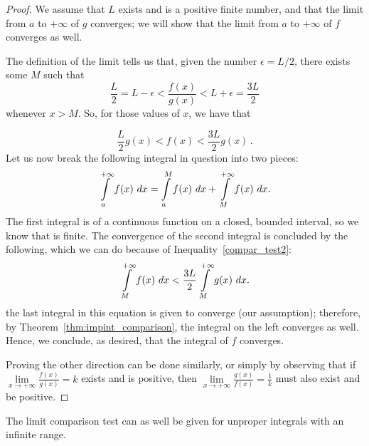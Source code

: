 \begin{proof}
We assume that $L$ exists and is a positive finite number, and that the limit from $a$ to $+\infty$ of $g$ converges; we will show that the limit from $a$ to $+\infty$ of $f$ converges as well. 

The definition of the limit tells us that, given the number $\epsilon=L/2$, there exists some $M$ such that
$$
\frac{L}{2}=L-\epsilon< \frac{f(x)}{g(x)}<L+\epsilon=\frac{3L}{2}
$$
whenever $x>M$. So, for those values of $x$, we have that 

\begin{equation}
\frac{L}{2}g(x)<f(x)<\frac{3L}{2}g(x)\,.
\label{compar_test2}
\end{equation}
Let us now break the following integral in question into two pieces:
$$
\ds \int\limits_a^{+\infty} f(x)\ dx=\ds \int\limits_a^{M} f(x)\ dx+\ds \int\limits_{M}^{+\infty} f(x)\ dx.
$$
The first integral is of a continuous function on a closed, bounded interval, so we know that is finite. The convergence of the second integral is concluded by the following, which we can do because of Inequality~\eqref{compar_test2}:
$$
\ds \int\limits_{M}^{+\infty} f(x)\ dx<\frac{3L}{2}\ds \int\limits_{M}^{+\infty} g(x)\ dx.
$$
the last integral in this equation is given to converge (our assumption); therefore, by Theorem~\ref{thm:impint_comparison}, the integral on the left converges as well. Hence, we conclude, as desired, that the integral of $f$ converges. 

Proving the other direction can be done similarly, or simply by observing that if $\lim\limits_{x \to +\infty}\frac{f(x)}{g(x)}=k$ exists and is positive, then
$\lim\limits_{x \to +\infty}\frac{g(x)}{f(x)}=\frac{1}{k}$ must also exist and be positive.
\end{proof}


The limit comparison test can as well be given for unproper integrals with an infinite range.


